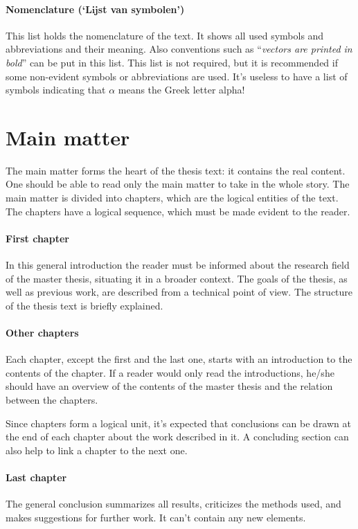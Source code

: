 \documentclass[11pt,article,oneside,a4paper]{memoir}
\newcommand\Dutch[1]{`\foreignlanguage{dutch}{#1}'}
\begin{document}
\paragraph{Nomenclature (\Dutch{Lijst van symbolen})} This list holds the
nomenclature of the text. It shows all used symbols and abbreviations and
their meaning. Also conventions such as ``\emph{vectors are printed in
  bold}'' can be put in this list. This list is not required, but it is
recommended if some non-evident symbols or abbreviations are used. It's
useless to have a list of symbols indicating that $\alpha$ means the Greek
letter alpha!

\section{Main matter}
The main matter forms the heart of the thesis text: it contains the real
content. One should be able to read only the main matter to take in the
whole story. The main matter is divided into chapters, which are the
logical entities of the text. The chapters have a logical sequence, which
must be made evident to the reader.

\paragraph{First chapter} In this general introduction the reader must be
informed about the research field of the master thesis, situating it in a
broader context. The goals of the thesis, as well as previous work, are
described from a technical point of view. The structure of the thesis text
is briefly explained.

\paragraph{Other chapters} Each chapter, except the first and the last one,
starts with an introduction to the contents of the chapter. If a reader
would only read the introductions, he/she should have an overview of the
contents of the master thesis and the relation between the chapters.

Since chapters form a logical unit, it's expected that conclusions can be
drawn at the end of each chapter about the work described in it. A
concluding section can also help to link a chapter to the next one.

\paragraph{Last chapter} The general conclusion summarizes all results,
criticizes the methods used, and makes suggestions for further work. It
can't contain any new elements.
\end{document}
